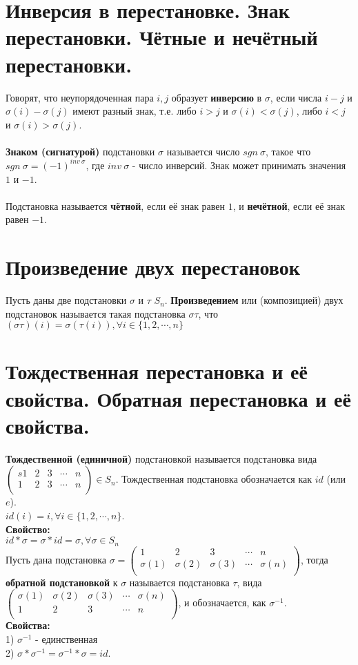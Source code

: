\documentclass[a4paper,11pt]{report}
\begin{document}
\section{Инверсия в перестановке. Знак перестановки. Чётные и нечётный перестановки.}
Говорят, что неупорядоченная пара ${i, j}$ образует \textbf{инверсию} в $\sigma$, если числа $i - j$ и $\sigma(i) - \sigma(j)$ имеют
разный знак, т.е. либо $i > j$ и $\sigma(i) < \sigma(j)$, либо $i < j$ и $\sigma(i) > \sigma(j)$.\\
\\
\textbf{Знаком (сигнатурой)} подстановки $\sigma$ называется число $sgn\ \sigma$,
такое что $sgn\ \sigma = (-1)^{inv\ \sigma}$, где $inv\ \sigma$ - число инверсий.
Знак может принимать значения $1$ и $-1$.\\
\\
Подстановка называется \textbf{чётной}, если её знак равен $1$, и \textbf{нечётной}, если её знак равен $-1$.
\section{Произведение двух перестановок}
Пусть даны две подстановки $\sigma$ и $\tau$ \in $S_n$. \textbf{Произведением} или (композицией) двух подстановок называется
такая подстановка $\sigma\tau$, что $(\sigma\tau)(i) = \sigma(\tau(i)), \forall i \in \{1, 2, \cdots, n\}$
\section{Тождественная перестановка и её свойства. Обратная перестановка и её свойства.}
\textbf{Тождественной (единичной)} подстановкой называется подстановка вида $
\begin{pmatrix}s
 1 & 2 & 3 & \cdots & n\\
 1 & 2 & 3 & \cdots & n\\
\end{pmatrix}
\in S_n$. Тождественная подстановка обозначается как $id$ (или $e$).\\
$id(i) = i, \forall i \in \{1, 2, \cdots, n\}$.\\
\textbf{Свойство:}\\
$id * \sigma = \sigma * id = \sigma, \forall \sigma \in S_n$\\
Пусть дана подстановка $\sigma = 
\begin{pmatrix}
 1 & 2 & 3 & \cdots & n\\
 \sigma(1) & \sigma(2) & \sigma(3) & \cdots & \sigma(n)\\
\end{pmatrix}$,
тогда \textbf{обратной подстановкой} к $\sigma$ называется подстановка
$\tau$, вида 
$
\begin{pmatrix}
 \sigma(1) & \sigma(2) & \sigma(3) & \cdots & \sigma(n)\\
 1 & 2 & 3 & \cdots & n\\
\end{pmatrix}
$, и обозначается, как $\sigma^{-1}$.\\
\textbf{Свойства:}\\
1) $\sigma^{-1}$ - единственная\\
2) $\sigma * \sigma^{-1} = \sigma^{-1} * \sigma = id$.\\
\end{document}
